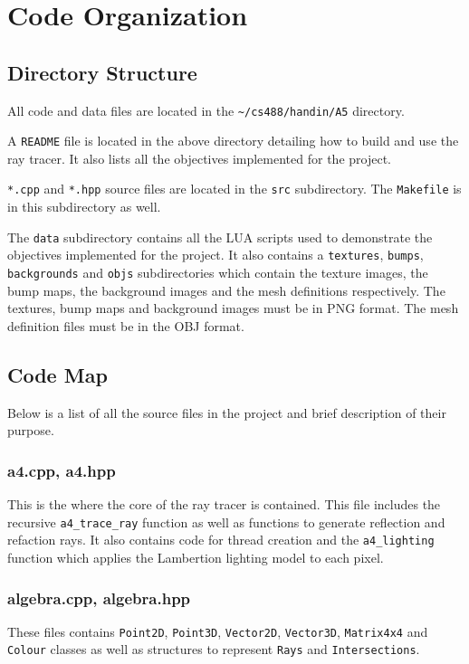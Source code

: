 \chapter{Code Organization}

\section{Directory Structure}
All code and data files are located in the \verb|~/cs488/handin/A5| directory.

A \verb|README| file is located in the above directory detailing how to build
and use the ray tracer. It also lists all the objectives implemented for the
project.

\verb|*.cpp| and \verb|*.hpp| source files are located in the \verb|src| 
subdirectory. The \verb|Makefile| is in this subdirectory as well.

The \verb|data| subdirectory contains all the LUA scripts used to demonstrate
the objectives implemented for the project. It also contains a \verb|textures|,
\verb|bumps|, \verb|backgrounds| and \verb|objs| subdirectories which contain
the texture images, the bump maps, the background images and the mesh
definitions respectively. The textures, bump maps and background images must be
in PNG format. The mesh definition files must be in the OBJ format.

\section{Code Map}
Below is a list of all the source files in the project and brief description of
their purpose.

\subsection*{a4.cpp, a4.hpp}
This is the where the core of the ray tracer is contained. This file includes
the recursive \verb|a4_trace_ray| function as well as functions to generate
reflection and refaction rays. It also contains code for thread creation and the
\verb|a4_lighting| function which applies the Lambertion lighting model to each
pixel.

\subsection*{algebra.cpp, algebra.hpp}
These files contains \verb|Point2D|, \verb|Point3D|, \verb|Vector2D|,
\verb|Vector3D|, \verb|Matrix4x4| and \verb|Colour| classes as well as 
structures to represent \verb|Rays| and \verb|Intersections|.

